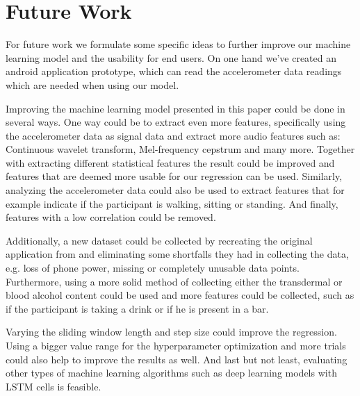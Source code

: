 \section{Future Work}\label{sec:futurework}
For future work we formulate some specific ideas to further improve our machine learning model and the usability for end users.
On one hand we've created an android application prototype, which can read the accelerometer data readings which are needed when using our model.

Improving the machine learning model presented in this paper could be done in several ways. One way could be to extract even more features, specifically using the accelerometer data as signal data and extract more audio features such as: Continuous wavelet transform, Mel-frequency cepstrum and many more. Together with extracting different statistical features the result could be improved and features that are deemed more usable for our regression can be used. Similarly, analyzing the accelerometer data could also be used to extract features that for example indicate if the participant is walking, sitting or standing. And finally, features with a low correlation could be removed.

Additionally, a new dataset could be collected by recreating the original application from \cite{DBLP:conf/ijcai/KillianPNMC19} and eliminating some shortfalls they had in collecting the data, e.g. loss of phone power, missing or completely unusable data points. Furthermore, using a more solid method of collecting either the transdermal or blood alcohol content could be used and more features could be collected, such as if the participant is taking a drink or if he is present in a bar.

Varying the sliding window length and step size could improve the regression. Using a bigger value range for the hyperparameter optimization and more trials could also help to improve the results as well. And last but not least, evaluating other types of machine learning algorithms such as deep learning models with LSTM cells is feasible. 